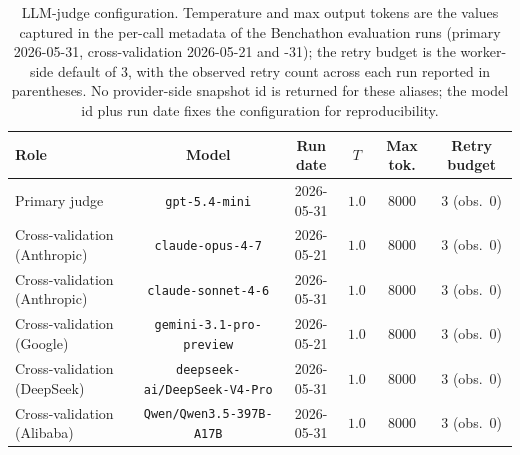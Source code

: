 \begin{table}[t]
\centering\footnotesize
\caption{LLM-judge configuration. Temperature and max output tokens are the values captured in the per-call metadata of the Benchathon evaluation runs (primary 2026-05-31, cross-validation 2026-05-21 and -31); the retry budget is the worker-side default of 3, with the observed retry count across each run reported in parentheses. No provider-side snapshot id is returned for these aliases; the model id plus run date fixes the configuration for reproducibility.}
\label{tbl-judge-config}
\setlength{\tabcolsep}{4pt}
\begin{tabular*}{\textwidth}{@{\extracolsep{\fill}}lccccc@{}}
\toprule
Role & Model & Run date & $T$ & Max tok. & Retry budget \\
\midrule
Primary judge & \texttt{gpt-5.4-mini} & 2026-05-31 & $1.0$ & $8000$ & $3$ (obs.\ $0$) \\
Cross-validation (Anthropic) & \texttt{claude-opus-4-7} & 2026-05-21 & $1.0$ & $8000$ & $3$ (obs.\ $0$) \\
Cross-validation (Anthropic) & \texttt{claude-sonnet-4-6} & 2026-05-31 & $1.0$ & $8000$ & $3$ (obs.\ $0$) \\
Cross-validation (Google) & \texttt{gemini-3.1-pro-preview} & 2026-05-21 & $1.0$ & $8000$ & $3$ (obs.\ $0$) \\
Cross-validation (DeepSeek) & \texttt{deepseek-ai/DeepSeek-V4-Pro} & 2026-05-31 & $1.0$ & $8000$ & $3$ (obs.\ $0$) \\
Cross-validation (Alibaba) & \texttt{Qwen/Qwen3.5-397B-A17B} & 2026-05-31 & $1.0$ & $8000$ & $3$ (obs.\ $0$) \\
\bottomrule
\end{tabular*}
\end{table}

